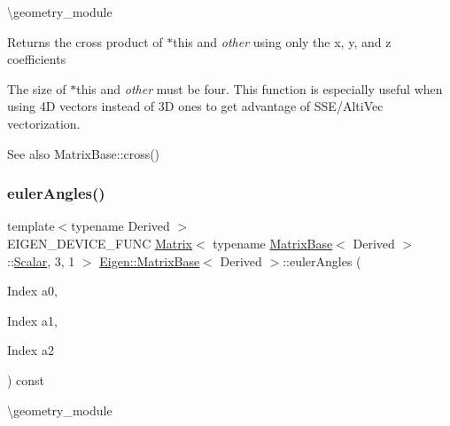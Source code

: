 \textbackslash{}geometry\+\_\+module

\begin{DoxyReturn}{Returns}
the cross product of {\ttfamily $\ast$this} and {\itshape other} using only the x, y, and z coefficients
\end{DoxyReturn}
The size of {\ttfamily $\ast$this} and {\itshape other} must be four. This function is especially useful when using 4D vectors instead of 3D ones to get advantage of S\+S\+E/\+Alti\+Vec vectorization.

\begin{DoxySeeAlso}{See also}
Matrix\+Base\+::cross() 
\end{DoxySeeAlso}
\mbox{\label{group___geometry___module_ga24e8dc29689f0075ba5b1f90c02b76dc}} 
\subsubsection{\texorpdfstring{eulerAngles()}{eulerAngles()}}
{\footnotesize\ttfamily template$<$typename Derived $>$ \\
E\+I\+G\+E\+N\+\_\+\+D\+E\+V\+I\+C\+E\+\_\+\+F\+U\+NC \mbox{\hyperlink{class_eigen_1_1_matrix}{Matrix}}$<$ typename \mbox{\hyperlink{class_eigen_1_1_matrix_base}{Matrix\+Base}}$<$ Derived $>$\+::\mbox{\hyperlink{class_eigen_1_1_dense_base_a5feed465b3a8e60c47e73ecce83e39a2}{Scalar}}, 3, 1 $>$ \mbox{\hyperlink{class_eigen_1_1_matrix_base}{Eigen\+::\+Matrix\+Base}}$<$ Derived $>$\+::euler\+Angles (\begin{DoxyParamCaption}\item[{Index}]{a0,  }\item[{Index}]{a1,  }\item[{Index}]{a2 }\end{DoxyParamCaption}) const\hspace{0.3cm}{\ttfamily [inline]}}

\textbackslash{}geometry\+\_\+module

